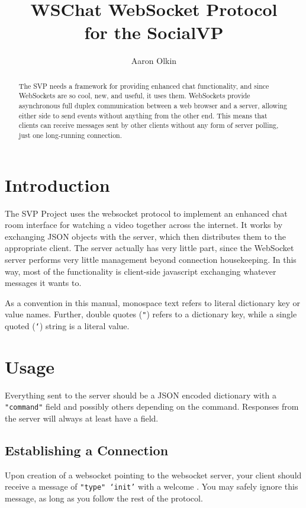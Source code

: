 \documentclass[12pt,letterpaper]{article}
\begin{document}
\title{WSChat WebSocket Protocol\\for the SocialVP}
\author{Aaron Olkin}
\maketitle
\vfill
\begin{abstract}
The SVP needs a framework for providing enhanced chat functionality, and since WebSockets are so cool, new, and useful, it uses them. WebSockets provide asynchronous full duplex communication between a web browser and a server, allowing either side to send events without anything from the other end. This means that clients can receive messages sent by other clients without any form of server polling, just one long-running connection.
\end{abstract}
\clearpage

\section{Introduction}
The SVP Project uses the websocket protocol to implement an enhanced chat room interface for watching a video together across the internet. It works by exchanging JSON objects with the server, which then distributes them to the appropriate client. The server actually has very little part, since the WebSocket server performs very little management beyond connection housekeeping. In this way, most of the functionality is client-side javascript exchanging whatever messages it wants to.

As a convention in this manual, monospace text refers to literal dictionary key or value names. Further, double quotes (\texttt{"}) refers to a dictionary key, while a single quoted (\texttt{`}) string is a literal value.

\section{Usage}
Everything sent to the server should be a JSON encoded dictionary with a \texttt{"command"} field and possibly others depending on the command. Responses from the server will always at least have a \tttype  field.

\subsection{Establishing a Connection}
Upon creation of a websocket pointing to the websocket server, your client should receive a message of \texttt{"type" `init'} with a welcome \ttmessage. You may safely ignore this message, as long as you follow the rest of the protocol.
\end{document}
